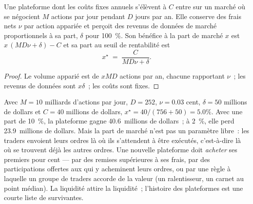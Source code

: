 \begin{proposition}\label{prop:m1:exchanges-brokers-venues:breakeven}
Une plateforme dont les coûts fixes annuels s'élèvent à $C$ entre sur un marché où se négocient $M$ actions par jour
pendant $D$ jours par an. Elle conserve des frais nets $\nu$ par action appariée et perçoit
des revenus de données de marché proportionnels à sa part, $\delta$ pour 100~\%. Son
bénéfice à la part de marché $x$ est $x\,(M D \nu + \delta) - C$ et sa
part au seuil de rentabilité est
\[
x^\star \;=\; \frac{C}{M D \nu + \delta}.
\]
\end{proposition}
\begin{proof}
Le volume apparié est de $xMD$ actions par an, chacune rapportant $\nu$~; les revenus de données sont
$x\delta$~; les coûts sont fixes.
\end{proof}

\begin{example}\label{ex:m1:exchanges-brokers-venues:five}
Avec $M = 10$ milliards d'actions par jour, $D = 252$, $\nu = 0.03$ cent, $\delta =
50$ millions de dollars et $C = 40$ millions de dollars, $x^\star = 40/(756+50) = 5.0\%$. Avec une
part de 10~\%, la plateforme gagne 40.6~millions de dollars~; à 2~\%, elle perd 23.9~millions de dollars.
Mais la part de marché n'est pas un paramètre libre~: les traders envoient leurs ordres là où ils s'attendent à être exécutés,
c'est-à-dire là où se trouvent déjà les autres ordres. Une nouvelle plateforme doit
\emph{acheter} ses premiers pour cent --- par des remises supérieures à ses frais, par
des participations offertes aux  qui y acheminent leurs ordres, ou par une règle à laquelle
un groupe de traders accorde de la valeur (un ralentisseur, un carnet au point médian). La liquidité attire
la liquidité~; l'histoire des plateformes est une courte liste de survivantes.
\end{example}

\begin{omfigure}

\end{omfigure}

